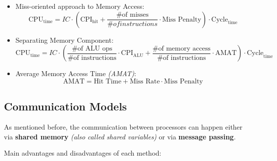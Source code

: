 \documentclass[english]{article}
\begin{document}
\begin{itemize}
  \item Miss-oriented approach to Memory Access:
        \[ \text{CPU}_\text{time} = IC \cdot \left( \text{CPI}_\text{hit} + \dfrac{\text{\# of misses}}{\# of instructions} \cdot \text{Miss Penalty} \right) \cdot \text{Cycle}_\text{time} \]
  \item Separating Memory Component:
        \[ \text{CPU}_\text{time} = IC \cdot \left( \dfrac{\text{\# of ALU ops}}{\text{\# of instructions}} \cdot \text{CPI}_\text{ALU} + \dfrac{\text{\# of memory access}}{\text{\# of instructions}} \cdot \text{AMAT} \right) \cdot \text{Cycle}_\text{time} \]
  \item Average Memory Access Time \textit{(AMAT)}:
        \[ \text{AMAT} = \text{Hit Time} + \text{Miss Rate} \cdot \text{Miss Penalty} \]
\end{itemize}

\subsection{Communication Models}

As mentioned before, the communication between processors can happen either via \textbf{shared memory} \textit{(also called shared variables)} or via \textbf{message passing}.

Main advantages and disadvantages of each method:
\end{document}
